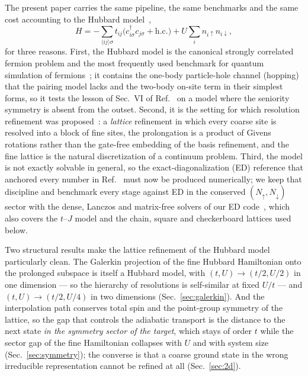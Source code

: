 \documentclass[
  aps,
  prc,
  reprint,
  superscriptaddress,
  floatfix,
  nofootinbib
]{revtex4-2}
\begin{document}
The present paper carries the same pipeline, the same benchmarks and the
same cost accounting to the Hubbard model~\cite{Hubbard1963,Arovas2022},
\begin{equation}
  H=-\sum_{\langle ij\rangle\sigma}t_{ij}\big(c^\dagger_{i\sigma}c_{j\sigma}+\mathrm{h.c.}\big)
   +U\sum_i n_{i\uparrow}n_{i\downarrow},
  \label{eq:hubbard}
\end{equation}
for three reasons.  First, the Hubbard model is the canonical strongly
correlated fermion problem and the most frequently used benchmark for
quantum simulation of
fermions~\cite{Wecker2015,Cade2020,Cai2020,Stanisic2022}; it contains the
one-body particle-hole channel (hopping) that the pairing model lacks and
the two-body on-site term in their simplest forms, so it tests the lesson of
Sec.~VI of Ref.~\cite{EigenQPairing2026} on a model where the seniority
symmetry is absent from the outset.  Second, it is the setting for which
resolution refinement was proposed~\cite{Bogner2026}: a \emph{lattice}
refinement in which every coarse site is resolved into a block of fine
sites, the prolongation is a product of Givens rotations rather than the
gate-free embedding of the basis refinement, and the fine lattice is the
natural discretization of a continuum problem.  Third, the model is not
exactly solvable in general, so the exact-diagonalization (ED) reference
that anchored every number in Ref.~\cite{EigenQPairing2026} must now be
produced numerically; we keep that discipline and benchmark every stage
against ED in the conserved $(N_\uparrow,N_\downarrow)$ sector with the
dense, Lanczos and matrix-free solvers of our ED code~\cite{HubbardNotebook},
which also covers the $t$--$J$ model and the chain, square and checkerboard
lattices used below.

Two structural results make the lattice refinement of the Hubbard model
particularly clean.  The Galerkin projection of the fine Hubbard Hamiltonian
onto the prolonged subspace is itself a Hubbard model, with $(t,U)\to(t/2,U/2)$
in one dimension --- so the hierarchy of resolutions is self-similar at
fixed $U/t$ --- and $(t,U)\to(t/2,U/4)$ in two dimensions
(Sec.~\ref{sec:galerkin}).  And the interpolation path conserves total spin
and the point-group symmetry of the lattice, so the gap that controls the
adiabatic transport is the distance to the next state \emph{in the symmetry
sector of the target}, which stays of order $t$ while the sector gap of the
fine Hamiltonian collapses with $U$ and with system size
(Sec.~\ref{sec:symmetry}); the converse is that a coarse ground state in the
wrong irreducible representation cannot be refined at all
(Sec.~\ref{sec:2d}).
\end{document}
